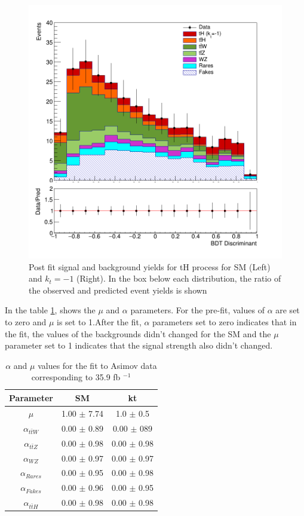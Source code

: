 \begin{linenumbers}
\begin{figure}[!htbp]
\begin{minipage}[b]{0.48\textwidth}
		\includegraphics[width=\textwidth]{Chapter4/simple-kt-1.png}
	\end{minipage}
	\caption{Post fit signal and background yields for tH process for SM (Left) and $k_t=-1$ (Right).
		In the box below each distribution, the ratio of the observed and predicted event yields is shown}
\label{simple}
\end{figure}
In the table \ref{parameters}, shows the $\mu$ and $\alpha$ parameters. For the pre-fit, values of $\alpha$ are set to zero and $\mu$ is set to 1.After the fit,  $\alpha$ parameters set to zero indicates that in the fit, the values of the backgrounds didn't changed for the SM and the $\mu$ parameter set to 1 indicates that the signal strength also didn't changed.
\begin{table}[ht]
	\centering
	\caption{$\alpha$ and $\mu$ values  for the fit to Asimov data corresponding to 35.9 fb $^{-1}$}
	\begin{tabular}{ccc}
		\hline
		Parameter  & SM &kt\\
		\hline
		$\mu$   & 1.00 $\pm$  7.74& 1.0 $\pm$  0.5\\
		$\alpha_{t\bar{t}W}$&  0.00 $\pm$  0.89&  0.00 $\pm$  089\\
		$\alpha_{t\bar{t}Z}$ &  0.00 $\pm$  0.98& 0.00 $\pm$  0.98\\
		$\alpha_{WZ}$   & 0.00 $\pm$  0.97& 0.00 $\pm$  0.97\\
		$\alpha_{Rares}$   &0.00 $\pm$  0.95&0.00 $\pm$  0.98 \\
		$\alpha_{Fakes}$ &   0.00 $\pm$  0.96& 0.00 $\pm$  0.95\\
		$\alpha_{t\bar{t}H}$ &0.00 $\pm$  0.98& 0.00 $\pm$ 0.98\\
	\end{tabular}
\label{parameters}
\end{table}



\end{linenumbers}
